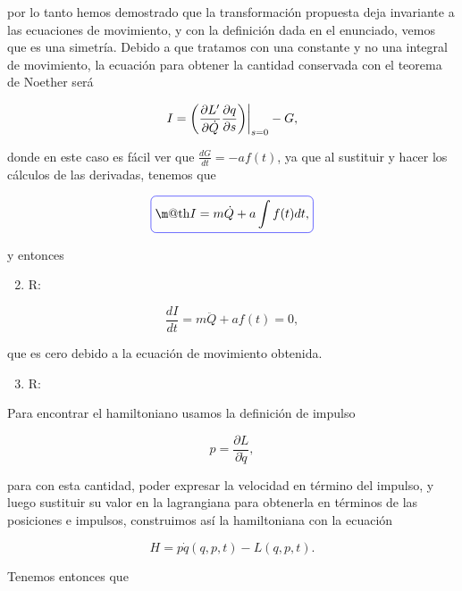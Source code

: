 \documentclass[a4paper,10pt]{article}
\makeatletter
\numberwithin{equation}{section}
\newcommand{\zerodel}{.\kern-\nulldelimiterspace}
\newcommand*{\boxcolor}{blue}
\renewcommand{\boxed}[1]{\textcolor{\boxcolor}{%
\tikz[baseline={([yshift=-1ex]current bounding box.center)}] \node [rectangle, minimum width=1ex,rounded corners,draw] {\normalcolor\m@th$\displaystyle#1$};}}
\makeatother
\begin{document}
por lo tanto hemos demostrado que la transformación propuesta deja invariante a las 
ecuaciones de movimiento, y con la definición dada en el enunciado, vemos que es 
una simetría. Debido a que tratamos con una constante y no una integral de movimiento, 
la ecuación para obtener la cantidad conservada con el teorema de Noether será 

\begin{equation}
 I = \left(\left\zerodel\frac{\partial L'}{\partial \dot{Q}}
 \frac{\partial q}{\partial s}\right)\right|_{s=0} - G,
\end{equation}

donde en este caso es fácil ver que $\frac{dG}{dt} = - af(t)$, ya que al sustituir 
y hacer los cálculos de las derivadas, tenemos que 

\begin{equation}
 \boxed{I = m\dot{Q} + a\int f(t) dt,}
\end{equation}

y entonces 

\begin{enumerate}[label=\alph*)]
\setcounter{enumi}{1}
 \item R:
\end{enumerate}

\begin{equation}
 \frac{dI}{dt} = m\ddot{Q} + af(t) = 0,
\end{equation}

que es cero debido a la ecuación de movimiento obtenida.

\begin{enumerate}[label=\alph*)]
\setcounter{enumi}{2}
 \item R:
\end{enumerate}

Para encontrar el hamiltoniano usamos la definición de impulso 

\begin{equation}
 p = \frac{\partial L}{\partial \dot{q}},
\end{equation}

para con esta cantidad, poder expresar la velocidad en término del impulso, y luego 
sustituir su valor en la lagrangiana para obtenerla en términos de las posiciones 
e impulsos, construimos así la hamiltoniana con la ecuación 

\begin{equation}
 H = p\dot{q}(q,p,t) - L(q,p,t).
\end{equation}

Tenemos entonces que 
\end{document}
